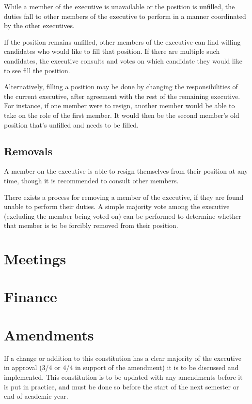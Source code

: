 \documentclass[11pt]{article}
\begin{document}
While a member of the executive is unavailable or the position is unfilled, the duties fall to other members of the executive to perform in a manner coordinated by the other executives.

\vspace{2mm}
\noindent
If the position remains unfilled, other members of the executive can find willing candidates who would like to fill that position. If there are multiple such candidates, the executive consults and votes on which candidate they would like to see fill the position.

\vspace{2mm}
\noindent
Alternatively, filling a position may be done by changing the responsibilities of the current executive, after agreement with the rest of the remaining executive. For instance, if one member were to resign, another member would be able to take on the role of the first member. It would then be the second member's old position that's unfilled and needs to be filled.

\subsection{Removals}

A member on the executive is able to resign themselves from their position at any time, though it is recommended to consult other members.

\vspace{2mm}
\noindent
There exists a process for removing a member of the executive, if they are found unable to perform their duties. A simple majority vote among the executive (excluding the member being voted on) can be performed to determine whether that member is to be forcibly removed from their position.

\section{Meetings}

\section{Finance}

\section{Amendments}

If a change or addition to this constitution has a clear majority of the executive in approval (3/4 or 4/4 in support of the amendment) it is to be discussed and implemented. This constitution is to be updated with any amendments before it is put in practice, and must be done so before the start of the next semester or end of academic year.
\end{document}
